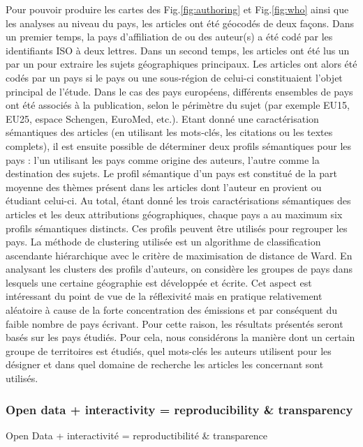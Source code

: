 {Pour pouvoir produire les cartes des Fig.\ref{fig:authoring} et Fig.\ref{fig:who} ainsi que les analyses au niveau du pays, les articles ont été géocodés de deux façons. Dans un premier temps, la pays d'affiliation de ou des auteur(s) a été codé par les identifiants ISO à deux lettres. Dans un second temps, les articles ont été lus un par un pour extraire les sujets géographiques principaux. Les articles ont alors été codés par un pays si le pays ou une sous-région de celui-ci constituaient l'objet principal de l'étude. Dans le cas des pays européens, différents ensembles de pays ont été associés à la publication, selon le périmètre du sujet (par exemple EU15, EU25, espace Schengen, EuroMed, etc.). Etant donné une caractérisation sémantiques des articles (en utilisant les mots-clés, les citations ou les textes complets), il est ensuite possible de déterminer deux profils sémantiques pour les pays : l'un utilisant les pays comme origine des auteurs, l'autre comme la destination des sujets. Le profil sémantique d'un pays est constitué de la part moyenne des thèmes présent dans les articles dont l'auteur en provient ou étudiant celui-ci. Au total, étant donné les trois caractérisations sémantiques des articles et les deux attributions géographiques, chaque pays a au maximum six profils sémantiques distincts. Ces profils peuvent être utilisés pour regrouper les pays. La méthode de clustering utilisée est un algorithme de classification ascendante hiérarchique avec le critère de maximisation de distance de Ward. En analysant les clusters des profils d'auteurs, on considère les groupes de pays dans lesquels une certaine géographie est développée et écrite. Cet aspect est intéressant du point de vue de la réflexivité mais en pratique relativement aléatoire à cause de la forte concentration des émissions et par conséquent du faible nombre de pays écrivant. Pour cette raison, les résultats présentés seront basés sur les pays étudiés. Pour cela, nous considérons la manière dont un certain groupe de territoires est étudiés, quel mots-clés les auteurs utilisent pour les désigner et dans quel domaine de recherche les articles les concernant sont utilisés.
}



\subsubsection{Open data + interactivity = reproducibility \& transparency}{Open Data + interactivité = reproductibilité \& transparence}


